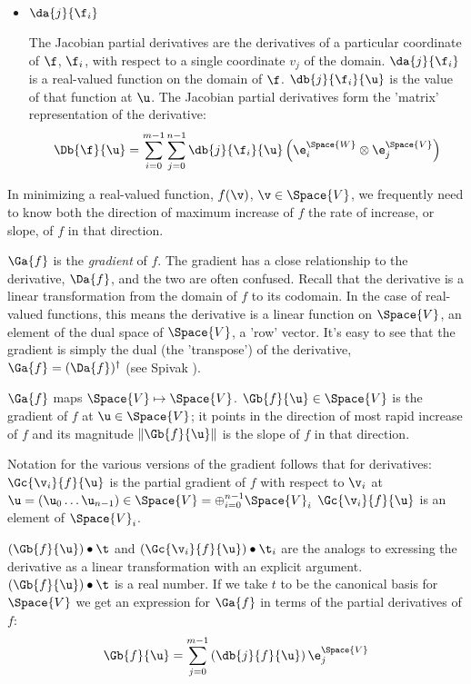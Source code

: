 \begin{itemize}
\item $\da{j}{\f_i}$

The Jacobian partial derivatives are the derivatives of
a particular coordinate of $\f$, $\f_i$, with respect to
a single coordinate $v_j$ of the domain.
$\da{j}{\f_i}$ is a real-valued function on the domain of $\f$.
$\db{j}{\f_i}{\u}$ is the value of that function at $\u$.
The Jacobian partial derivatives form the 'matrix' representation of the derivative:
\begin{equation}
\Db{\f}{\u} =
\sum_{i=0}^{m-1}
\sum_{j=0}^{n-1}
\db{j}{\f_i}{\u} \left( \e_i^{\Space{W}} \otimes \e_j^{\Space{V}} \right)
\end{equation}

\end{itemize}

In minimizing a real-valued function, $f(\v)$, $\v \in \Space{V}$,
we frequently need to know both the direction of maximum increase of $f$
the rate of increase, or slope, of $f$ in that direction.

$\Ga{f}$ is the \textit{gradient} of $f$.
The gradient has a close relationship to the derivative, $\Da{f}$,
and the two are often confused.
Recall that the derivative is a linear transformation
from the domain of $f$ to its codomain.
In the case of real-valued functions,
this means the derivative is a linear function on $\Space{V}$,
an element of the dual space of $\Space{V}$, a 'row' vector.
It's easy to see that the gradient is simply the dual (the 'transpose')
of the derivative, $\Ga{f} = (\Da{f})^{\dagger}$
(see Spivak \cite[p.~96, ex.~4-18]{spivak-1965}).

$\Ga{f}$ maps $\Space{V} \mapsto \Space{V}$.
$\Gb{f}{\u} \in \Space{V}$ is the gradient of $f$ at $\u \in \Space{V}$;
it points in the direction of most rapid increase of
$f$ and its magnitude $\| \Gb{f}{\u} \|$ is the
slope of $f$ in that direction.

Notation for the various versions of the gradient
follows that for derivatives:
$\Gc{\v_i}{f}{\u}$ is the partial gradient of $f$ with respect to $\v_i$ at
$\u = \left( \u_0 \ldots \u_{n-1} \right) \in \Space{V} = \oplus_{i=0}^{n-1} \Space{V}_i$
$\Gc{\v_i}{f}{\u}$ is an element of $\Space{V}_i$.

$(\Gb{f}{\u}) \bullet  \t$
and
$(\Gc{\v_i}{f}{\u}) \bullet \t_i$
are the analogs to exressing the derivative as a linear transformation
with an explicit argument.
$(\Gb{f}{\u}) \bullet  \t$ is a real number.
If we take $t$ to be the canonical basis for $\Space{V}$
we get an expression for $\Ga{f}$ in terms of the partial derivatives of $f$:
\begin{equation}
\label{eq:gradient-from-partials}
\Gb{f}{\u} = \sum_{j=0}^{m-1} \left( \db{j}{f}{\u} \right) \e_j^{\Space{V}}
\end{equation}

